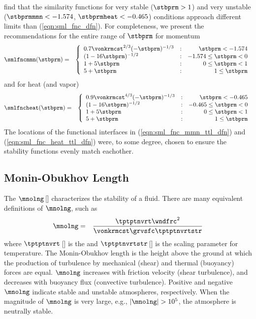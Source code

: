 \documentclass[12pt,twoside]{book}
\begin{document}
\cite{ZZD98} find that the similarity functions for very stable
($\stbprm > 1$) and very unstable ($\stbprmmmn < -1.574$, 
$\stbprmheat < -0.465$) conditions approach different limits than
(\ref{eqn:sml_fnc_dfn}).
For completeness, we present the \cite{ZZD98} recommendations for
the entire range of $\stbprm$ for momentum
\begin{eqnarray}
\smlfncmmn(\stbprm) & = & \left\{
\begin{array}{l@{\quad:\quad}r}
0.7\vonkrmcst^{2/3}(-\stbprm)^{-1/3} & \stbprm < -1.574 \\
( 1 - 16 \stbprm )^{-1/2} & -1.574 \le \stbprm < 0 \\
1 + 5 \stbprm & 0 \le \stbprm < 1 \\
5 + \stbprm & 1 \le \stbprm  \\
\end{array} \right.
\label{eqn:sml_fnc_mmn_ttl_dfn}
\end{eqnarray}
and for heat (and vapor)
\begin{eqnarray}
\smlfncheat(\stbprm) & = & \left\{
\begin{array}{l@{\quad:\quad}r}
0.9\vonkrmcst^{4/3}(-\stbprm)^{-1/3} & \stbprm < -0.465 \\
( 1 - 16 \stbprm )^{-1/2} & -0.465 \le \stbprm < 0 \\
1 + 5 \stbprm & 0 \le \stbprm < 1 \\
5 + \stbprm & 1 \le \stbprm  \\
\end{array} \right.
\label{eqn:sml_fnc_heat_ttl_dfn}
\end{eqnarray}
The locations of the functional interfaces in
(\ref{eqn:sml_fnc_mmn_ttl_dfn}) and (\ref{eqn:sml_fnc_heat_ttl_dfn})
were, to some degree, chosen to ensure the stability functions evenly
match eachother. 

\subsection[Monin-Obukhov Length]{Monin-Obukhov Length}\label{sxn:mno_lng}
The  $\mnolng$\,[\m] characterizes the
stability of a fluid.
There are many equivalent definitions of $\mnolng$, such as
\begin{eqnarray}
\label{eqn:mno_lng_dfn}
\mnolng & = & \frac{\tptptnvrt\wndfrc^{2}}{\vonkrmcst\grvsfc\tptptnvrtstr}
\end{eqnarray}
where $\tptptnvrt$\,[\K] is the  and
$\tptptnvrtstr$\,[\K] is the scaling parameter for temperature.
The Monin-Obukhov length is the height above the ground at which
the production of turbulence by mechanical (shear) and thermal
(buoyancy) forces are equal.
$\mnolng$ increases with friction velocity (shear turbulence), and
decreases with buoyancy flux (convective turbulence).
Positive and negative $\mnolng$ indicate stable and unstable
atmospheres, respectively.
When the magnitude of $\mnolng$ is very large, e.g., 
$|\mnolng| > 10^{5}$, the atmosphere is neutrally stable.
\end{document}
